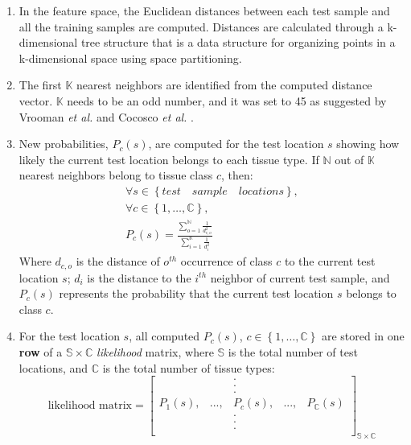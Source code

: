 \begin{enumerate}
\item In the feature space, the Euclidean distances between each test sample and all the training samples are computed.
Distances are calculated through a k-dimensional tree structure \cite{Bentley75} that is a data structure for organizing points in a k-dimensional space using space partitioning.

\item The first $\mathbb{K}$ nearest neighbors are identified from the computed distance vector. $\mathbb{K}$ needs to be an odd number, and it was set to 45 as suggested by Vrooman \emph{et al.} \cite{Vrooman2007} and Cocosco \emph{et al.} \cite{Cocosco2003}.

\item
New probabilities, $P_c(s)$, are computed for the test location $s$ showing how likely the current test location belongs to each tissue type.
If $\mathbb{N}$ out of $\mathbb{K}$ nearest neighbors belong to tissue class $c$, then:
\begin{equation}
\begin{gathered}
\forall s\in \left\{test \quad sample \quad locations\right\}, \\
\forall c\in \left\{1,\ldots, \mathbb{C}\right\}, \\
P_c(s) = \frac{ \sum_{o=1}^{\mathbb{N}} \frac{1}{d_{c,o}^2} }{ \sum_{i=1}^{\mathbb{K}} \frac{1}{d_{i}^2} }
\end{gathered}
\end{equation}
Where $d_{c,o}$ is the distance of $o^{th}$ occurrence of class $c$ to the current test location $s$; $d_{i}$ is the distance to the $i^{th}$ neighbor of current test sample, and $P_c(s)$ represents the probability that the current test location $s$ belongs to class $c$.

\item For the test location $s$, all computed $P_c(s)$, $c\in \left\{1,\ldots, \mathbb{C}\right\}$ are stored in one \textbf{row} of a $\mathbb{S}\times \mathbb{C}$ \textit{likelihood} matrix, where $\mathbb{S}$ is the total number of test locations, and $\mathbb{C}$ is the total number of tissue types:
\begin{equation}
\textrm{likelihood matrix} =
\begin{bmatrix}
 & & . \\
 & & . \\
 & & . \\
P_1(s), & ..., & P_c(s), & ..., & P_{\mathbb{C}}(s) \\
 & & . \\
 & & . \\
 & & . \\
\end{bmatrix}_{\mathbb{S}\times \mathbb{C}}
\end{equation}


\end{enumerate}
